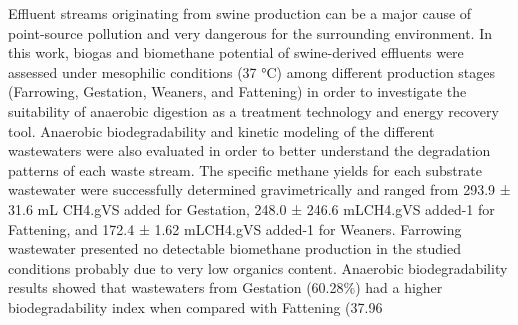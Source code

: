 Effluent streams originating from swine production can be a major cause of point-source pollution and very dangerous for the surrounding environment. In this work, biogas and biomethane potential of swine-derived effluents were assessed under mesophilic conditions (37 °C) among different production stages (Farrowing, Gestation, Weaners, and Fattening) in order to investigate the suitability of anaerobic digestion as a treatment technology and energy recovery tool. Anaerobic biodegradability and kinetic modeling of the different wastewaters were also evaluated in order to better understand the degradation patterns of each waste stream. The specific methane yields for each substrate wastewater were successfully determined gravimetrically and ranged from 293.9 ± 31.6 mL CH4.gVS added for Gestation, 248.0 ± 246.6 mLCH4.gVS added-1 for Fattening, and 172.4 ± 1.62 mLCH4.gVS added-1 for Weaners. Farrowing wastewater presented no detectable biomethane production in the studied conditions probably due to very low organics content.  Anaerobic biodegradability results showed that wastewaters from Gestation (60.28\%) had a higher biodegradability index when compared with Fattening (37.96%
